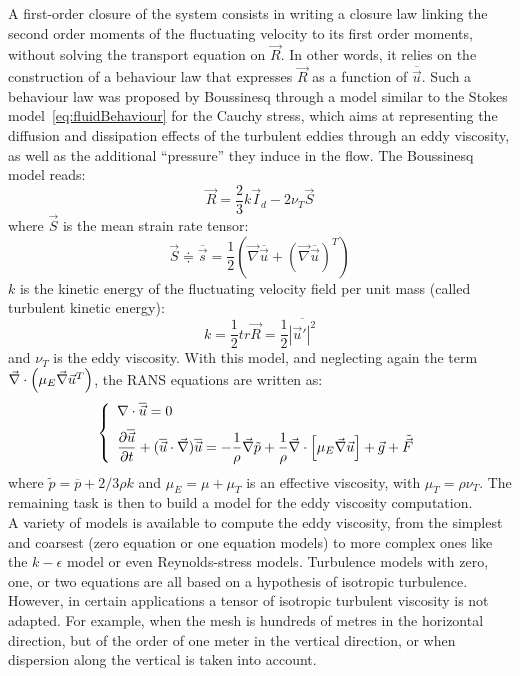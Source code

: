 A first-order closure of the system consists in writing a closure law linking the second order moments of the fluctuating velocity to its first order moments,
without solving the transport equation on $\vec R$.
In other words, it relies on the construction of a behaviour law that expresses $\vec{R}$ as a function of $\overline{\vec{u}}$.
Such a behaviour law was proposed by Boussinesq through a model similar to the Stokes model~\eqref{eq:fluidBehaviour} for the Cauchy stress, which aims at representing the
diffusion and dissipation effects of the turbulent eddies through an eddy viscosity, as well as the additional ``pressure'' they induce in the flow. The Boussinesq model reads:
\begin{equation}\label{eq:Boussinesq}
  \vec{R} = \dfrac{2}{3}k\vec{I}_d-2\nu_T\vec S
\end{equation}
where $\vec S$ is the mean strain rate tensor:
\begin{equation}\label{eq:meanS}
  \vec S \doteqdot \overline{\vec s} = \dfrac{1}{2}\left(\vec\nabla \overline{\vec{u}} + (\vec\nabla \overline{\vec{u}})^T\right)
\end{equation}
$k$ is the kinetic energy of the fluctuating velocity field per unit mass (called turbulent kinetic energy):
\begin{equation}
  k=\dfrac{1}{2} tr \vec R=\dfrac{1}{2}\overline{|\vec{u}'|^2}
\end{equation}
and $\nu_T$ is the eddy viscosity.
With this model, and neglecting again the term $\vec{\nabla} \cdot \left(\mu_E\vec \nabla \vec{u}^T\right)$, the RANS equations are written as:
\begin{equation}\label{eq:Reynolds_k}
  \left\{
    \begin{array}{l}
      \nabla \cdot \overline{\vec{u}} = 0 \medskip \\
      \dfrac{\partial \overline{\vec{u}} }{\partial t} + (\overline{\vec{u}} \cdot \Grad)\overline{\vec{u}}=-\dfrac{1}{\rho} \vec{\nabla} \tilde p + \dfrac{1}{\rho} \vec{\nabla} \cdot \left[\mu_E\Grad \vec{u}\right]+ \vec{g} + \tilde{\vec{F}}\\
    \end{array}
  \right.
\end{equation}
where $\tilde p = \overline{p}+2/3 \rho k$ and $\mu_E=\mu+\mu_T$ is an effective viscosity, with $\mu_T = \rho \nu_T$.
The remaining task is then to build a model for the eddy viscosity computation.\\

A variety of models is available to compute the eddy viscosity, from the simplest and coarsest
(zero equation or one equation models) to more complex ones like the $k-\epsilon$ model or even
Reynolds-stress models.
Turbulence models with zero, one, or two equations are all based on a
hypothesis of isotropic turbulence. However, in certain applications a tensor
of isotropic turbulent viscosity is not adapted. For example, when the mesh is
hundreds of metres in the horizontal direction, but of the order of one meter in
the vertical direction, or when dispersion along the vertical is taken into account.

